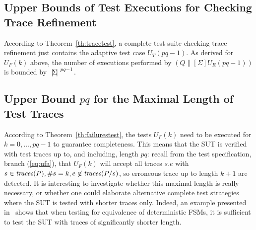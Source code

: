 \subsection{Upper Bounds of Test Executions for Checking Trace Refinement}

According to Theorem~\ref{th:tracetest}, a complete test suite checking trace
refinement just contains the adaptive test case $U_T(pq-1)$. As derived for $U_F(k)$
above, the number of executions performed by $(Q\parallel[\Sigma] U_R(pq-1))$ 
is bounded by ${~|\! \Sigma\!|~}^{pq-1}$.


\subsection{Upper Bound $pq$ for the Maximal Length of Test Traces}

According to Theorem~\ref{th:failurestest}, the tests $U_F(k)$ need to be executed for 
$k = 0,\dots,pq-1$ to guarantee completeness. This means that the SUT is verified 
with test traces up to, and including, length $pq$:
recall from the test specification, branch (\ref{eq:ufa}), that $U_F(k)$ will accept
all traces $s.e$ with $s\in\text{\it traces}(P), \#s = k, e\not\in\text{\it traces}(P/s)$, so erroneous trace
up to length $k+1$ are detected.
It is interesting to  investigate
whether this maximal length is really necessary, or whether one could elaborate
alternative complete test strategies where the SUT is tested with shorter traces only. 
Indeed, an example  presented in~\cite[Exercise~5]{PeleskaHuangLectureNotesMBT} 
shows that when testing for equivalence of deterministic FSMs, it is sufficient to
test the SUT with traces of significantly shorter length.

